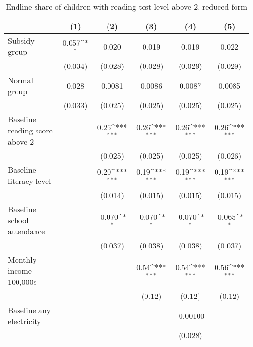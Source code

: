\begin{table}[htbp]\centering
\def\sym#1{\ifmmode^{#1}\else\(^{#1}\)\fi}
\caption{Endline share of children with reading test level above 2, reduced form}
\begin{tabular*}{1\hsize}{@{\hskip\tabcolsep\extracolsep\fill}l*{5}{c}}
\toprule
                &\multicolumn{1}{c}{(1)}         &\multicolumn{1}{c}{(2)}         &\multicolumn{1}{c}{(3)}         &\multicolumn{1}{c}{(4)}         &\multicolumn{1}{c}{(5)}         \\
\midrule
Subsidy group   &    0.057\sym{*}  &    0.020         &    0.019         &    0.019         &    0.022         \\
                &  (0.034)         &  (0.028)         &  (0.028)         &  (0.029)         &  (0.029)         \\
Normal group    &    0.028         &   0.0081         &   0.0086         &   0.0087         &   0.0085         \\
                &  (0.033)         &  (0.025)         &  (0.025)         &  (0.025)         &  (0.025)         \\
Baseline reading score above 2&                  &     0.26\sym{***}&     0.26\sym{***}&     0.26\sym{***}&     0.26\sym{***}\\
                &                  &  (0.025)         &  (0.025)         &  (0.025)         &  (0.026)         \\
Baseline literacy level&                  &     0.20\sym{***}&     0.19\sym{***}&     0.19\sym{***}&     0.19\sym{***}\\
                &                  &  (0.014)         &  (0.015)         &  (0.015)         &  (0.015)         \\
Baseline school attendance&                  &   -0.070\sym{*}  &   -0.070\sym{*}  &   -0.070\sym{*}  &   -0.065\sym{*}  \\
                &                  &  (0.037)         &  (0.038)         &  (0.038)         &  (0.037)         \\
Monthly income 100,000s&                  &                  &     0.54\sym{***}&     0.54\sym{***}&     0.56\sym{***}\\
                &                  &                  &   (0.12)         &   (0.12)         &   (0.12)         \\
Baseline any electricity&                  &                  &                  & -0.00100         &                  \\
                &                  &                  &                  &  (0.028)         &                  \\

\end{tabular*}
\end{table}
